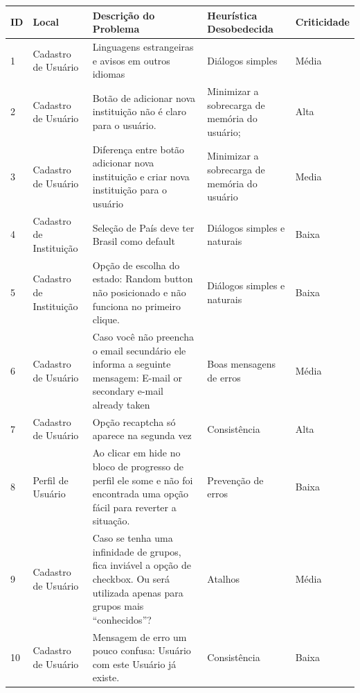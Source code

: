 \begin{table}[h!]
\begin{tabular}{|l|p{3cm}|p{6cm}|p{3cm}|l|}
\hline
\textbf{ID} & \textbf{Local} & \textbf{Descrição do Problema}                                                                                     & \textbf{Heurística Desobedecida} & \textbf{Criticidade} \\ \hline
1           & Cadastro de Usuário                 & Linguagens estrangeiras e avisos em outros idiomas & Diálogos simples  & Média                \\ \hline
2           & Cadastro de Usuário      & Botão de adicionar nova instituição não é claro para o usuário.  & Minimizar a sobrecarga de memória do usuário;           & Alta                \\ \hline
3           & Cadastro de Usuário               & Diferença entre botão adicionar nova instituição e criar nova instituição para o usuário  & Minimizar a sobrecarga de memória do usuário & Media                \\ \hline
4           & Cadastro de Instituição             & Seleção de País deve ter Brasil como default  & Diálogos simples e naturais    & Baixa                \\ \hline
5           & Cadastro de Instituição      & Opção de escolha do estado: Random button não posicionado e não funciona no primeiro clique. & Diálogos simples e naturais  & Baixa                \\ \hline
6           & Cadastro de Usuário  & Caso você não preencha o email secundário ele informa a seguinte mensagem: E-mail or secondary e-mail already taken & Boas mensagens de erros                & Média                \\ \hline
7           & Cadastro de Usuário  & Opção recaptcha só aparece na segunda vez & Consistência                     & Alta                \\ \hline
8           & Perfil de Usuário  & Ao clicar em hide no bloco de progresso de perfil ele some e não foi encontrada uma opção fácil para reverter a situação.
 & Prevenção de erros                     & Baixa                \\ \hline
9           & Cadastro de Usuário  & Caso se tenha uma infinidade de grupos, fica inviável a opção de checkbox. Ou será utilizada apenas para grupos mais ``conhecidos''? & Atalhos & Média                \\ \hline
10           & Cadastro de Usuário  & Mensagem de erro um pouco confusa: Usuário com este Usuário já existe.  & Consistência                     & Baixa                \\ \hline
\end{tabular}
\end{table}

